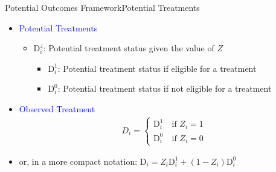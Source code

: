 \documentclass[dvipsnames,hyperref={pdfpagelabels=false}]{beamer}
\begin{document}
\begin{frame}{Potential Outcomes Framework}{Potential Treatments}
	\begin{itemize}
		
		\item \textcolor{blue}{Potential Treatments}
		\vspace{0.2cm}
		\begin{itemize}
			\item $\mathrm{D}^{z}_{i}$: Potential treatment status given the value of $Z$
			\vspace{0.2cm}
					\begin{itemize}
			\item $\mathrm{D}^{1}_{i}$: Potential treatment status if eligible for a treatment 
						\vspace{0.2cm}
					
			\vspace{0.2cm}
			\item $\mathrm{D}^{0}_{i}$: Potential treatment status if not eligible for a treatment 
			\vspace{0.2cm}
					\end{itemize}
			
		\end{itemize}
		\vspace{0.2cm}
		\item \textcolor{blue}{Observed Treatment}
		\begin{align*}
		D_{i}=\left\lbrace
		\begin{array}{l}
		\mathrm{D}^{1}_{i}\quad \text{if $Z_{i}=1$} \\
		\mathrm{D}^{0}_{i}\quad \text{if $Z_{i}=0$}
		\end{array}\right.
		\end{align*}
		\item or, in a more compact notation: 
		$\mathrm{D}_{i}=Z_{i}\mathrm{D}^{1}_{i}+(1-Z_{i})\mathrm{D}^{0}_{i} $
		
	\end{itemize}
\end{frame}
\end{document}
